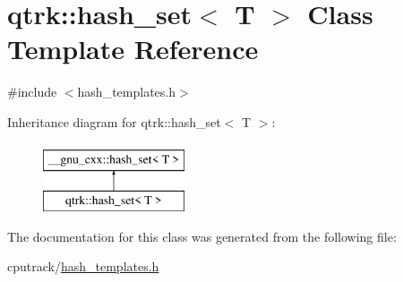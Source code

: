 \hypertarget{classqtrk_1_1hash__set}{}\section{qtrk\+:\+:hash\+\_\+set$<$ T $>$ Class Template Reference}
\label{classqtrk_1_1hash__set}


{\ttfamily \#include $<$hash\+\_\+templates.\+h$>$}

Inheritance diagram for qtrk\+:\+:hash\+\_\+set$<$ T $>$\+:\begin{figure}[H]
\begin{center}
\leavevmode
\includegraphics[height=2.000000cm]{classqtrk_1_1hash__set}
\end{center}
\end{figure}


The documentation for this class was generated from the following file\+:\begin{DoxyCompactItemize}
\item 
cputrack/\hyperlink{hash__templates_8h}{hash\+\_\+templates.\+h}\end{DoxyCompactItemize}
